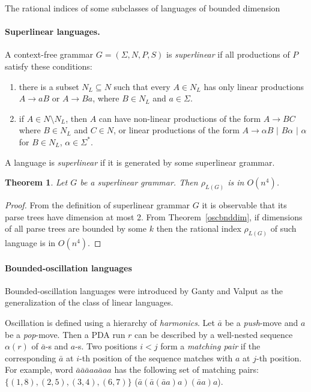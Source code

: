 \documentclass[11pt,a4paper]{article} %
\newtheorem{theorem}{Theorem}
\begin{document}
\begin{subsection}{The rational indices of some subclasses of languages of bounded dimension}  



\paragraph{Superlinear languages.} 
A context-free grammar $G = (\Sigma, N, P, S)$ is \textit{superlinear} \cite{superlinear} if all productions of $P$ satisfy these conditions:
\begin{enumerate}
\item there is a subset $N_L \subseteq N$ such that every $A \in N_L$ has only linear productions $A\rightarrow aB$ or $A\rightarrow Ba$, where $B \in N_L$ and $a \in \Sigma$.
\item if $A \in N \setminus N_L$, then $A$ can have non-linear productions of the form $A \rightarrow BC$ where $B\in N_L$ and $C \in N$, or linear productions of the form $A\rightarrow \alpha B$ $\vert$ $B \alpha$ $\vert$ $\alpha$ for $B \in N_L$, $\alpha \in \Sigma^*$.
\end{enumerate}
A language is \textit{superlinear} if it is generated by some superlinear grammar. 
\begin{theorem} Let $G$ be a superlinear grammar. Then $\rho_{L(G)}$ is in $O(n^4)$.
\end{theorem}
\begin{proof}
From the definition of superlinear grammar $G$ it is observable that its parse trees have dimension at most 2. From 
Theorem~\ref{oscbnddim}, if dimensions of all parse trees are bounded by some $k$ then the rational index $\rho_{L(G)}$ of such language is in $O(n^4)$.
\end{proof}


\paragraph{Bounded-oscillation languages}
 Bounded-oscillation languages were introduced by Ganty and Valput \cite{BoundOsc} as the generalization of the class of linear languages. 

Oscillation is defined using a hierarchy of \textit{harmonics}. Let $\bar{a}$ be a \textit{push}-move and $a$ be a \textit{pop}-move. Then a PDA run $r$ can be described by a well-nested sequence $\alpha(r)$ of $\bar{a}$-s and $a$-s. Two positions $i<j$ form a \textit{matching pair} if the corresponding $\bar{a}$ at $i$-th position of the sequence matches with $a$ at $j$-th position. For example, word $\bar{a}\bar{a}\bar{a}aa\bar{a}aa$ has the following set of matching pairs: $\{(1, 8), (2, 5), (3, 4), (6, 7)\}$ ($\bar{a}(\bar{a}(\bar{a}a)a)(\bar{a}a)a$).



\end{subsection}
\end{document}
